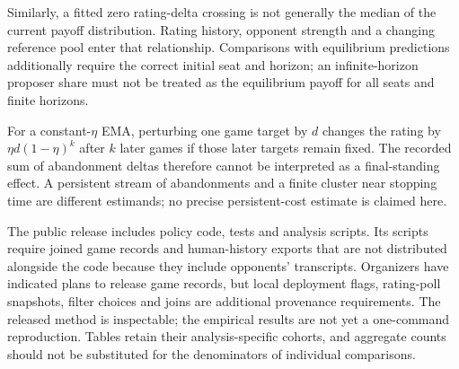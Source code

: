 Similarly, a fitted zero rating-delta crossing is not generally the median of
the current payoff distribution. Rating history, opponent strength and a
changing reference pool enter that relationship. Comparisons with equilibrium
predictions additionally require the correct initial seat and horizon; an
infinite-horizon proposer share must not be treated as the equilibrium payoff
for all seats and finite horizons.

For a constant-$\eta$ EMA, perturbing one game target by $d$ changes the rating
by $\eta d(1-\eta)^k$ after $k$ later games if those later targets remain fixed.
The recorded sum of abandonment deltas therefore cannot be interpreted as a
final-standing effect. A persistent stream of abandonments and a finite cluster
near stopping time are different estimands; no precise persistent-cost estimate
is claimed here.

The public release includes policy code, tests and analysis scripts. Its scripts
require joined game records and human-history exports that are not distributed
alongside the code because they include opponents' transcripts. Organizers have
indicated plans to release game records, but local deployment flags, rating-poll
snapshots, filter choices and joins are additional provenance requirements.
The released method is inspectable; the empirical results are not yet a
one-command reproduction. Tables retain their analysis-specific cohorts, and
aggregate counts should not be substituted for the denominators of individual
comparisons.

